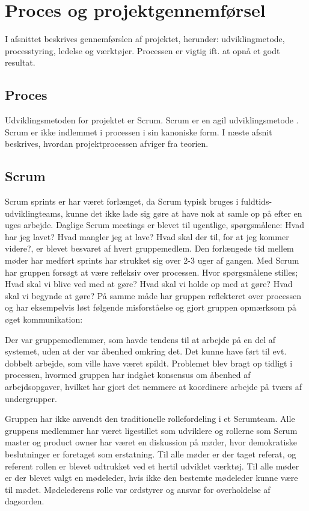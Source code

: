 \chapter{Proces og projektgennemførsel}

I afsnittet beskrives gennemførslen af projektet, herunder: udviklingmetode, processtyring, ledelse og værktøjer. Processen er vigtig ift. at opnå et godt resultat. 

\section{Proces}
Udviklingsmetoden for projektet er Scrum. Scrum er en agil udviklingsmetode \cite[kap. 1]{robertmartin2006}. Scrum er ikke indlemmet i processen i sin kanoniske form. I næste afsnit beskrives, hvordan projektprocessen afviger fra teorien.

\section{Scrum}
Scrum sprints er har været forlænget, da Scrum typisk bruges i fuldtids-udviklingteams, kunne det ikke lade sig gøre at have nok at samle op på efter en uges arbejde. Daglige Scrum meetings er blevet til ugentlige, spørgsmålene: Hvad har jeg lavet? Hvad mangler jeg at lave? Hvad skal der til, for at jeg kommer videre?, er blevet besvaret af hvert gruppemedlem. Den forlængede tid mellem møder har medført sprints har strukket sig over 2-3 uger af gangen. Med Scrum har gruppen forsøgt at være refleksiv over processen. Hvor spørgsmålene stilles; Hvad skal vi blive ved med at gøre? Hvad skal vi holde op med at gøre? Hvad skal vi begynde at gøre? På samme måde har gruppen reflekteret over processen og har eksempelvis løst følgende misforståelse og gjort gruppen opmærksom på øget kommunikation:

Der var gruppemedlemmer, som havde tendens til at arbejde på en del af systemet, uden at der var åbenhed omkring det. Det kunne have ført til evt. dobbelt arbejde, som ville have været spildt. Problemet blev bragt op tidligt i processen, hvormed gruppen har indgået konsensus om åbenhed af arbejdsopgaver, hvilket har gjort det nemmere at koordinere arbejde på tværs af undergrupper.

Gruppen har ikke anvendt den traditionelle rollefordeling i et Scrumteam. Alle gruppens medlemmer har været ligestillet som udviklere og rollerne som Scrum master og product owner har været en diskussion på møder, hvor demokratiske beslutninger er foretaget som erstatning. Til alle møder er der taget referat, og referent rollen er blevet udtrukket ved et hertil udviklet værktøj. Til alle møder er der blevet valgt en mødeleder, hvis ikke den bestemte mødeleder kunne være til mødet. Mødelederens rolle var ordstyrer og ansvar for overholdelse af dagsorden. 

